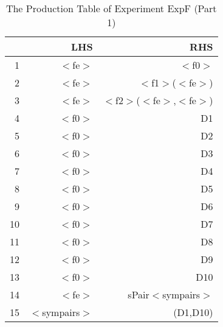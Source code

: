 \begin{table}[ht]
\centering
\begin{tabular}{rrr}
  \hline
 & LHS & RHS \\ 
  \hline
1 & $<$fe$>$ & $<$f0$>$ \\ 
  2 & $<$fe$>$ & $<$f1$>$($<$fe$>$) \\ 
  3 & $<$fe$>$ & $<$f2$>$($<$fe$>$,$<$fe$>$) \\ 
  4 & $<$f0$>$ & D1 \\ 
  5 & $<$f0$>$ & D2 \\ 
  6 & $<$f0$>$ & D3 \\ 
  7 & $<$f0$>$ & D4 \\ 
  8 & $<$f0$>$ & D5 \\ 
  9 & $<$f0$>$ & D6 \\ 
  10 & $<$f0$>$ & D7 \\ 
  11 & $<$f0$>$ & D8 \\ 
  12 & $<$f0$>$ & D9 \\ 
  13 & $<$f0$>$ & D10 \\ 
  14 & $<$fe$>$ & sPair$<$sympairs$>$ \\ 
  15 & $<$sympairs$>$ & (D1,D10) \\ 
   \hline
\end{tabular}
\caption{The Production Table of Experiment ExpF (Part 1)} 
\end{table}
